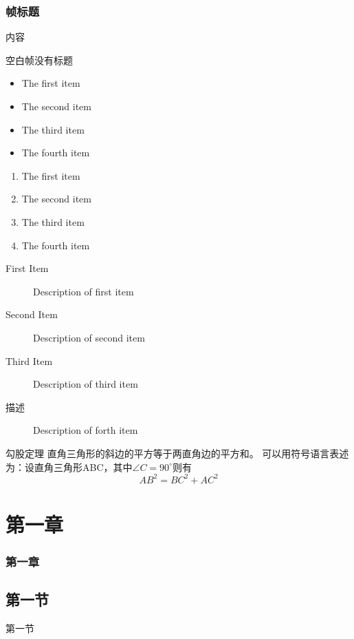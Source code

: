 \documentclass{beamer}
\begin{document}
        \begin{frame}
            \frametitle{帧标题}
        内容
        \end{frame}
    \begin{frame}[plain]
        空白帧没有标题
        \begin{itemize}
            \item The first item
            \item The second item
            \item The third item
            \item The fourth item
            \end{itemize}
    \end{frame}
    \begin{frame}[plain]
        \begin{enumerate}
            \item The first item
            \item The second item
            \item The third item
            \item The fourth item
            \end{enumerate}
    \end{frame}
    \begin{frame}[plain]
        \begin{description}
            \item[First Item] Description of first item
            \item[Second Item] Description of second item
            \item[Third Item] Description of third item
            \item[描述] Description of forth item
            \end{description}
    \end{frame}
     \begin{frame}[plain]
        \begin{block}{勾股定理}  
        直角三角形的斜边的平方等于两直角边的平方和。  
        可以用符号语言表述为：设直角三角形ABC，其中$\angle C=90^\circ$则有  
        \begin{equation}  
            AB^2=BC^2+AC^2  
        \end{equation}  
        \end{block}  
    \end{frame}
    
    \section{第一章}
    \begin{frame}
        \frametitle{第一章}
        \subsection {第一节}
        第一节
    \end{frame}
    
\end{document}

